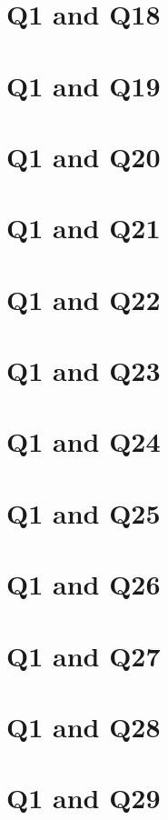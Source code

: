 \documentclass{report}
\begin{document}
\section{Q1 and Q18}\clearpage
\section{Q1 and Q19}\clearpage
\section{Q1 and Q20}\clearpage
\section{Q1 and Q21}\clearpage
\section{Q1 and Q22}\clearpage
\section{Q1 and Q23}\clearpage
\section{Q1 and Q24}\clearpage
\section{Q1 and Q25}\clearpage
\section{Q1 and Q26}\clearpage
\section{Q1 and Q27}\clearpage
\section{Q1 and Q28}\clearpage
\section{Q1 and Q29}\clearpage
\end{document}
